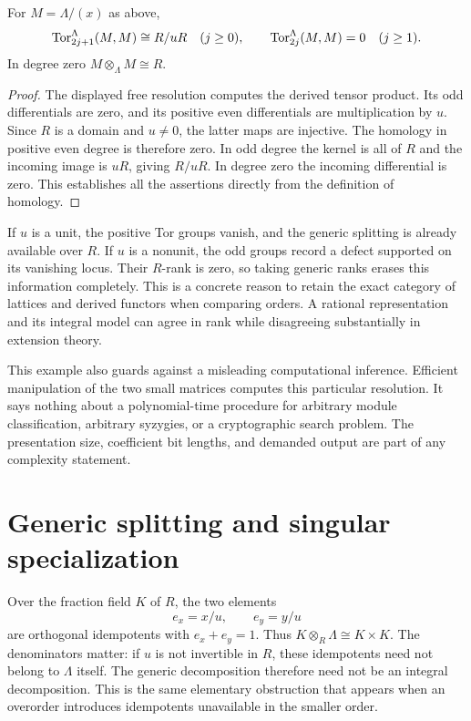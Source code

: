 \begin{proposition}\label{prop:tor-node}
For $M=\Lambda/(x)$ as above,
\[
 \operatorname{Tor}^{\Lambda}_{2j+1}(M,M)\cong R/uR\quad(j\geq0),
 \qquad
 \operatorname{Tor}^{\Lambda}_{2j}(M,M)=0\quad(j\geq1).
\]
In degree zero $M\otimes_\Lambda M\cong R$.
\end{proposition}
\begin{proof}
The displayed free resolution computes the derived tensor product. Its odd
differentials are zero, and its positive even differentials are
multiplication by $u$. Since $R$ is a domain and $u\ne0$, the latter maps are
injective. The homology in positive even degree is therefore zero. In odd
degree the kernel is all of $R$ and the incoming image is $uR$, giving
$R/uR$. In degree zero the incoming differential is zero. This establishes
all the assertions directly from the definition of homology.
\end{proof}

If $u$ is a unit, the positive Tor groups vanish, and the generic splitting
is already available over $R$. If $u$ is a nonunit, the odd groups record a
defect supported on its vanishing locus. Their $R$-rank is zero, so taking
generic ranks erases this information completely. This is a concrete reason
to retain the exact category of lattices and derived functors when comparing
orders. A rational representation and its integral model can agree in rank
while disagreeing substantially in extension theory.

This example also guards against a misleading computational inference.
Efficient manipulation of the two small matrices computes this particular
resolution. It says nothing about a polynomial-time procedure for arbitrary
module classification, arbitrary syzygies, or a cryptographic search problem.
The presentation size, coefficient bit lengths, and demanded output are part
of any complexity statement.

\section{Generic splitting and singular specialization}

Over the fraction field $K$ of $R$, the two elements
\[
 e_x=x/u,\qquad e_y=y/u
\]
are orthogonal idempotents with $e_x+e_y=1$. Thus
$K\otimes_R\Lambda\cong K\times K$. The denominators matter: if $u$ is not
invertible in $R$, these idempotents need not belong to $\Lambda$ itself.
The generic decomposition therefore need not be an integral decomposition.
This is the same elementary obstruction that appears when an overorder
introduces idempotents unavailable in the smaller order.

